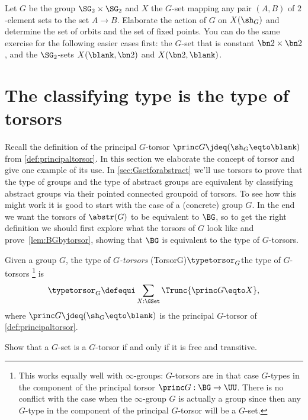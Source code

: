 \begin{xca}\label{xca:Gset-A->B}
Let $G$ be the group $\SG_2\times\SG_2$ and $X$ the $G$-set mapping
any pair $(A,B)$ of $2$-element sets to the set $A\to B$.
Elaborate the action of $G$ on $X(\sh_G)$ and determine the
set of orbits and the set of fixed points. You can
do the same exercise for the following easier cases first:
the $G$-set that is constant $\bn2\times\bn2$, and
the $\SG_2$-sets $X(\blank,\bn2)$ and $X(\bn2,\blank)$.
\end{xca}


\section{The classifying type is the type of torsors}
\label{sec:torsors}
Recall the definition of the principal $G$-torsor 
$\princ G \jdeq (\sh_G \eqto \blank)$ from \cref{def:principaltorsor}.
In this section we elaborate the concept of torsor and give one example
of its use.
In \cref{sec:Gsetforabstract} we'll use torsors to prove that the type of groups and the type of abstract groups are equivalent by classifying abstract groups via their pointed connected groupoid of torsors.  To see how this might work it is good to start with the case of a (concrete) group $G$.
In the end we want the torsors of $\abstr(G)$ to be equivalent to $\BG$, so to get the right definition we should first explore what the torsors of $G$ look like and prove~\cref{lem:BGbytorsor}, showing that $\BG$ is equivalent to the type of $G$-torsors.
\begin{definition}\label{def:Gtorsor}
  Given a group $G$, the type of \emph{$G$-torsors}%
  \glossary(TorsorG){$\protect\typetorsor_G$}{the type of $G$-torsors}%
  \footnote{This works equally well with $\infty$-groups: $G$-torsors are in that case $G$-types in the component of the principal torsor $\princ G:\BG\to\UU$. There is no conflict with the case when the $\infty$-group $G$ is actually a group since then any $G$-type in the component of the principal $G$-torsor will be a $G$-set.}
  is
  \[
    \typetorsor_G\defequi\sum_{X:\GSet}\Trunc{\princ G \eqto X},
  \]
  where $\princ G \jdeq (\sh_G \eqto \blank)$ is the 
  principal $G$-torsor of \cref{def:principaltorsor}.
\end{definition}

\begin{xca}\label{xca:torsor=free+transitive}
  Show that a $G$-set is a $G$-torsor if and only if it is free and transitive.
\end{xca}

